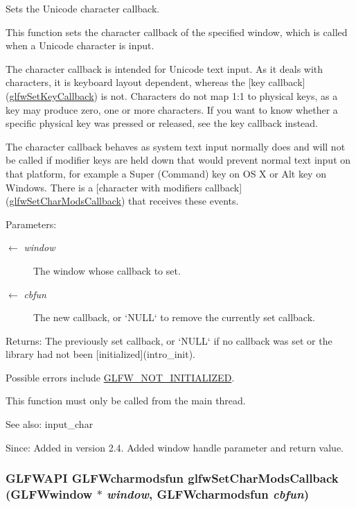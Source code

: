 Sets the Unicode character callback. 

This function sets the character callback of the specified window, which is called when a Unicode character is input.

The character callback is intended for Unicode text input. As it deals with characters, it is keyboard layout dependent, whereas the \mbox{[}key callback\mbox{]}(\hyperlink{group__input_ga73bb92f628a2a0be9c132d56f19362c}{glfwSetKeyCallback}) is not. Characters do not map 1:1 to physical keys, as a key may produce zero, one or more characters. If you want to know whether a specific physical key was pressed or released, see the key callback instead.

The character callback behaves as system text input normally does and will not be called if modifier keys are held down that would prevent normal text input on that platform, for example a Super (Command) key on OS X or Alt key on Windows. There is a \mbox{[}character with modifiers callback\mbox{]}(\hyperlink{group__input_ge6eee0bda7429bfe8028615847cf6795}{glfwSetCharModsCallback}) that receives these events.

\begin{Desc}
\item[Parameters:]
\begin{description}
\item[\mbox{$\leftarrow$} {\em window}]The window whose callback to set. \item[\mbox{$\leftarrow$} {\em cbfun}]The new callback, or `NULL` to remove the currently set callback. \end{description}
\end{Desc}
\begin{Desc}
\item[Returns:]The previously set callback, or `NULL` if no callback was set or the library had not been \mbox{[}initialized\mbox{]}(intro\_\-init).\end{Desc}
Possible errors include \hyperlink{group__errors_g2374ee02c177f12e1fa76ff3ed15e14a}{GLFW\_\-NOT\_\-INITIALIZED}.

This function must only be called from the main thread.

\begin{Desc}
\item[See also:]input\_\-char\end{Desc}
\begin{Desc}
\item[Since:]Added in version 2.4.  Added window handle parameter and return value. \end{Desc}
\hypertarget{group__input_ge6eee0bda7429bfe8028615847cf6795}{
\subsubsection[glfwSetCharModsCallback]{\setlength{\rightskip}{0pt plus 5cm}GLFWAPI {\bf GLFWcharmodsfun} glfwSetCharModsCallback ({\bf GLFWwindow} $\ast$ {\em window}, \/  {\bf GLFWcharmodsfun} {\em cbfun})}}
\label{group__input_ge6eee0bda7429bfe8028615847cf6795}


